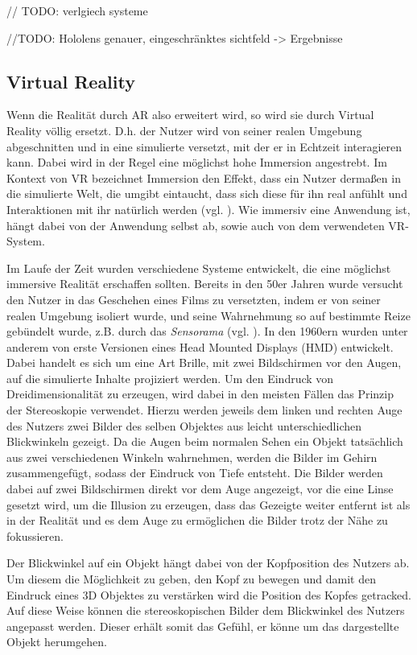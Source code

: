 // TODO:
verlgiech systeme

//TODO:
Hololens genauer, eingeschränktes sichtfeld -> Ergebnisse


\subsection{Virtual Reality}
\label{vr}

Wenn die Realität durch AR also erweitert wird, so wird sie durch Virtual Reality völlig ersetzt. D.h. der Nutzer wird von seiner realen Umgebung abgeschnitten und in eine simulierte versetzt, mit der er in Echtzeit 
interagieren kann. Dabei wird in der Regel eine möglichst hohe Immersion angestrebt. 
Im Kontext von VR bezeichnet Immersion den Effekt, dass ein Nutzer dermaßen in die simulierte Welt, die umgibt eintaucht, dass sich diese für ihn real anfühlt und Interaktionen mit ihr natürlich werden (vgl. \citet{Witmer98}). Wie immersiv eine Anwendung ist,		 hängt dabei von der Anwendung selbst ab, sowie auch von dem verwendeten VR-System. 

Im Laufe der Zeit wurden verschiedene Systeme entwickelt, die eine möglichst immersive Realität erschaffen sollten. 
Bereits in den 50er Jahren wurde versucht den Nutzer in das Geschehen eines Films zu versetzten, indem er von seiner realen Umgebung isoliert wurde, und seine Wahrnehmung so auf bestimmte Reize gebündelt wurde, z.B. durch das \textit{Sensorama} (vgl. \citet{sensorama}). %
In den 1960ern wurden unter anderem von \citet{Sutherland68} erste Versionen eines Head Mounted Displays (HMD) entwickelt. %
Dabei handelt es sich um eine Art Brille, mit zwei Bildschirmen vor den Augen, auf die simulierte Inhalte projiziert werden.
Um den Eindruck von Dreidimensionalität zu erzeugen, wird dabei in den meisten Fällen das Prinzip der Stereoskopie verwendet. Hierzu werden jeweils dem linken und rechten Auge des Nutzers zwei Bilder des selben Objektes aus leicht unterschiedlichen Blickwinkeln  gezeigt. Da die Augen beim normalen Sehen ein Objekt tatsächlich aus zwei verschiedenen Winkeln wahrnehmen, werden die Bilder im Gehirn zusammengefügt, sodass der Eindruck von Tiefe entsteht. Die Bilder werden dabei auf zwei Bildschirmen direkt vor dem Auge angezeigt, vor die eine Linse gesetzt wird, um die Illusion zu erzeugen, dass das Gezeigte weiter entfernt ist als in der Realität und es dem Auge zu ermöglichen die Bilder trotz der Nähe zu fokussieren.

Der Blickwinkel auf ein Objekt hängt dabei von der Kopfposition des Nutzers ab. Um diesem die Möglichkeit zu geben, den Kopf zu bewegen und damit den Eindruck eines 3D Objektes zu verstärken wird die Position des Kopfes getracked. Auf diese Weise können die stereoskopischen Bilder dem Blickwinkel des Nutzers angepasst werden. Dieser erhält somit das Gefühl, er könne um das dargestellte Objekt herumgehen. 

